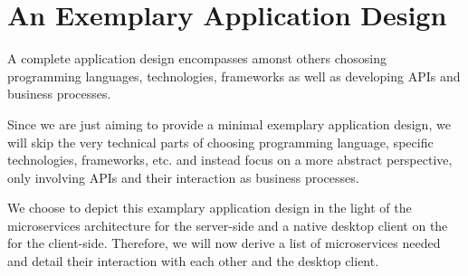 


\section{An Exemplary Application Design}
\label{sec:ApplicationDesign}
A complete application design encompasses amonst others chososing programming languages, technologies, frameworks as well as developing APIs and business processes.

Since we are just aiming to provide a minimal exemplary application design, we will skip the very technical parts of choosing programming language, specific technologies, frameworks, etc. and instead focus on a more abstract perspective, only involving APIs and their interaction as business processes.

We choose to depict this examplary application design in the light of the microservices architecture for the server-side and a native desktop client on the for the client-side.
Therefore, we will now derive a list of microservices needed and detail their interaction with each other and the desktop client.


